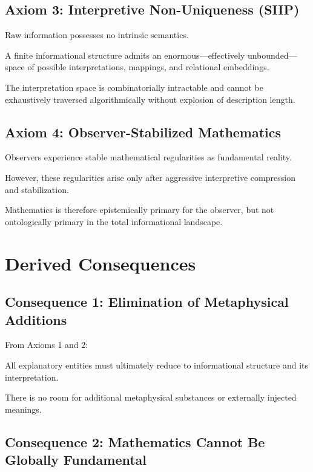 \subsection*{Axiom 3: Interpretive Non-Uniqueness (SIIP)}

Raw information possesses no intrinsic semantics.

A finite informational structure admits an enormous—effectively unbounded—space of possible interpretations, mappings, and relational embeddings.

The interpretation space is combinatorially intractable and cannot be exhaustively traversed algorithmically without explosion of description length.


\subsection*{Axiom 4: Observer-Stabilized Mathematics}

Observers experience stable mathematical regularities as fundamental reality.

However, these regularities arise only after aggressive interpretive compression and stabilization.

Mathematics is therefore epistemically primary for the observer, but not ontologically primary in the total informational landscape.



\section{Derived Consequences}

\subsection{Consequence 1: Elimination of Metaphysical Additions}

From Axioms 1 and 2:

All explanatory entities must ultimately reduce to informational structure and its interpretation.

There is no room for additional metaphysical substances or externally injected meanings.



\subsection*{Consequence 2: Mathematics Cannot Be Globally Fundamental}

